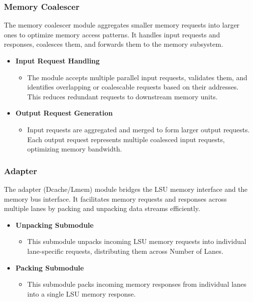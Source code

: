 \documentclass[12pt]{report}
\begin{document}
\subsubsection{Memory Coalescer}
The memory coalescer module aggregates smaller memory requests into larger ones to optimize memory access patterns. It handles input requests and responses, coalesces them, and forwards them to the memory subsystem.
\begin{itemize}
    \item \textbf{Input Request Handling}
        \begin{itemize}
            \item The module accepts multiple parallel input requests, validates them, and identifies overlapping or coalescable requests based on their addresses. This reduces redundant requests to downstream memory units.
        \end{itemize}
    \item \textbf{Output Request Generation}
        \begin{itemize}
            \item Input requests are aggregated and merged to form larger output requests. Each output request represents multiple coalesced input requests, optimizing memory bandwidth.
        \end{itemize}
\end{itemize}

\subsubsection{Adapter}
The adapter (Dcache/Lmem) module bridges the LSU memory interface and the memory bus interface. It facilitates memory requests and responses across multiple lanes by packing and unpacking data streams efficiently.
\begin{itemize}
    \item \textbf{Unpacking Submodule}
        \begin{itemize}
            \item This submodule unpacks incoming LSU memory requests into individual lane-specific requests, distributing them across Number of Lanes.
        \end{itemize}
    \item \textbf{Packing Submodule}
        \begin{itemize}
            \item This submodule packs incoming memory responses from individual lanes into a single LSU memory response.
        \end{itemize}
\end{itemize}
\end{document}
